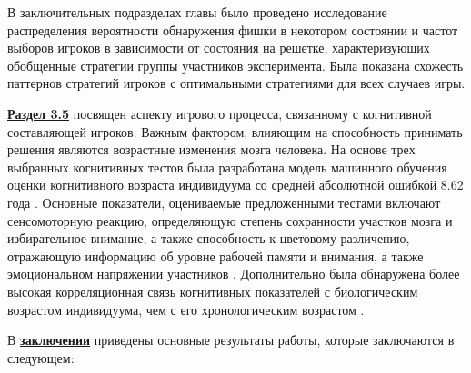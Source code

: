 В заключительных подразделах главы было проведено исследование распределения вероятности обнаружения фишки в некотором состоянии и частот выборов игроков в зависимости от состояния на решетке, характеризующих обобщенные стратегии группы участников эксперимента. Была показана схожесть паттернов стратегий игроков с оптимальными стратегиями для всех случаев игры.

\underline{\textbf{Раздел 3.5}} посвящен аспекту игрового процесса, связанному с когнитивной составляющей игроков. Важным фактором, влияющим на способность принимать решения являются возрастные изменения мозга человека. На основе трех выбранных когнитивных тестов была разработана модель машинного обучения оценки когнитивного возраста индивидуума со средней абсолютной ошибкой 8.62 года \cite{bib4}. Основные показатели, оцениваемые предложенными тестами включают сенсомоторную реакцию, определяющую степень сохранности участков мозга и избирательное внимание, а также способность к цветовому различению, отражающую информацию об уровне рабочей памяти и внимания, а также эмоциональном напряжении участников \cite{confbib2}. Дополнительно была обнаружена более высокая корреляционная связь когнитивных показателей с биологическим возрастом индивидуума, чем с его хронологическим возрастом \cite{confbib3}.


\FloatBarrier
{}                                  %
В \underline{\textbf{заключении}} приведены основные результаты работы, которые заключаются в следующем:



